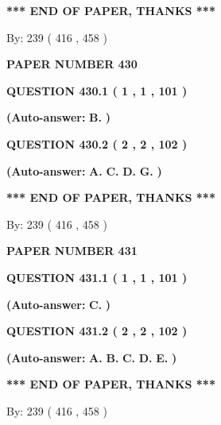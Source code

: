 \documentclass[12pt]{article}
\begin{document}
 
   
   
\vspace{1.0in} 
{\textbf{\large{ *** END OF PAPER, THANKS *** }}} 
   
   
\hspace{1.0in} By: 
 239 ( 416 ,  458 )
   
   
   
   
\newpage 
\setcounter{page}{ 
   430001 } 
   
   
 {\textbf{ \Large{ PAPER NUMBER  430  }}}
   
   
  
  
{\textbf{\large{QUESTION
430.1 
 ( 1 , 1 , 101 )
}}}
 
 
{\textbf{(Auto-answer:}}
{\textbf{\large{
B.}}}
{\textbf{)}}
 
 
  
  
{\textbf{\large{QUESTION
430.2 
 ( 2 , 2 , 102 )
}}}
 
 
{\textbf{(Auto-answer:}}
{\textbf{\large{
A.}}}
{\textbf{\large{
C.}}}
{\textbf{\large{
D.}}}
{\textbf{\large{
G.}}}
{\textbf{)}}
 
 
   
   
\vspace{1.0in} 
{\textbf{\large{ *** END OF PAPER, THANKS *** }}} 
   
   
\hspace{1.0in} By: 
 239 ( 416 ,  458 )
   
   
   
   
\newpage 
\setcounter{page}{ 
   431001 } 
   
   
 {\textbf{ \Large{ PAPER NUMBER  431  }}}
   
   
  
  
{\textbf{\large{QUESTION
431.1 
 ( 1 , 1 , 101 )
}}}
 
 
{\textbf{(Auto-answer:}}
{\textbf{\large{
C.}}}
{\textbf{)}}
 
 
  
  
{\textbf{\large{QUESTION
431.2 
 ( 2 , 2 , 102 )
}}}
 
 
{\textbf{(Auto-answer:}}
{\textbf{\large{
A.}}}
{\textbf{\large{
B.}}}
{\textbf{\large{
C.}}}
{\textbf{\large{
D.}}}
{\textbf{\large{
E.}}}
{\textbf{)}}
 
 
   
   
\vspace{1.0in} 
{\textbf{\large{ *** END OF PAPER, THANKS *** }}} 
   
   
\hspace{1.0in} By: 
 239 ( 416 ,  458 )
   
\end{document}
